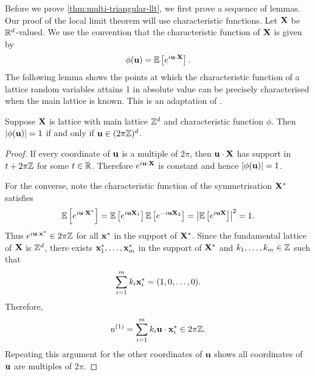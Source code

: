 Before we prove \cref{thm:multi-triangular-llt}, we first prove a sequence of lemmas. Our proof of the local limit theorem will use characteristic functions. Let $\vX$ be $\R^d$-valued. We use the convention that the characteristic function of $\vX$ is given by
\begin{equation*}
    \phi(\vu) = \E \left[ 
        e^{i \vu \cdot \vX}
    \right].
\end{equation*}
The following lemma shows the points at which the characteristic function of a lattice random variables attains 1 in absolute value can be precisely characterised when the main lattice is known. This is an adaptation of \cite[P.67, T1]{spitzerPrinciplesRandomWalk1964}.
\begin{lemma}
    \label{lem:cf-periodicity}
    Suppose $\vX$ is lattice with main lattice $\Z^d$ and characteristic function $\phi$. Then $\abs{\phi(\vu)} = 1$ if and only if $\vu \in (2 \pi \Z)^d$.
\end{lemma}
\begin{proof}
    If every coordinate of $\vu$ is a multiple of $2\pi$, then $\vu \cdot \vX$ has support in $t + 2 \pi \Z$ for some $t \in \R$. Therefore $e^{i\vu \cdot \vX}$ is constant and hence $\abs{\phi(\vu)} = 1$.
    
    For the converse, note the characteristic function of the symmetrisation $\vX^*$ satisfies
    \begin{equation*}
        \E\left[e^{i \vu \cdot \vX^*}\right]
        = \E\left[e^{i \vu \vX_1}\right] \E\left[e^{-i \vu \vX_2}\right]
        = \abs*{\E\left[e^{i \vu \vX}\right]}^2 = 1.
    \end{equation*}
    Thus $e^{i \vu \cdot \vx^*} \in 2 \pi \Z$ for all $\vx^*$ in the support of $\vX^*$. Since the fundamental lattice of $\vX$ is $\Z^d$, there exists $\vx^*_1, \ldots, \vx^*_m$ in the support of $\vX^*$ and $k_1, \ldots, k_m \in \Z$ such that
    \begin{equation*}
        \sum_{i=1}^m k_i \vx^*_i = (1, 0, \ldots, 0).
    \end{equation*}
    Therefore,
    \begin{equation*}
        u^{(1)} = \sum_{i=1}^m k_i \vu \cdot \vx^*_i \in 2 \pi \Z.
    \end{equation*}
    Repeating this argument for the other coordinates of $\vu$ shows all coordinates of $\vu$ are multiples of $2 \pi$.
\end{proof}

